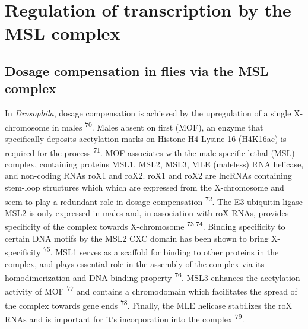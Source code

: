 \documentclass[11pt,twoside]{MPIthesis}
\theoremstyle{definition}
\theoremstyle{definition}
\theoremstyle{definition}
\theoremstyle{remark}
\begin{document}
\section{Regulation of transcription by the MSL
complex}\label{regulation-of-transcription-by-the-msl-complex}

\subsection{Dosage compensation in flies via the MSL
complex}\label{dosage-compensation-in-flies-via-the-msl-complex}

In \emph{Drosophila}, dosage compensation is achieved by the
upregulation of a single X-chromosome in males \textsuperscript{70}.
Males absent on first (MOF), an enzyme that specifically deposits
acetylation marks on Histone H4 Lysine 16 (H4K16ac) is required for the
process \textsuperscript{71}. MOF associates with the male-specific
lethal (MSL) complex, containing proteins MSL1, MSL2, MSL3, MLE
(maleless) RNA helicase, and non-coding RNAs roX1 and roX2. roX1 and
roX2 are lncRNAs containing stem-loop structures which which are
expressed from the X-chromosome and seem to play a redundant role in
dosage compensation \textsuperscript{72}. The E3 ubiquitin ligase MSL2
is only expressed in males and, in association with roX RNAs, provides
specificity of the complex towards X-chromosome \textsuperscript{73,74}.
Binding specificity to certain DNA motifs by the MSL2 CXC domain has
been shown to bring X-specificity \textsuperscript{75}. MSL1 serves as a
scaffold for binding to other proteins in the complex, and plays
essential role in the assembly of the complex via its homodimerization
and DNA binding property \textsuperscript{76}. MSL3 enhances the
acetylation activity of MOF \textsuperscript{77} and contains a
chromodomain which facilitates the spread of the complex towards gene
ends \textsuperscript{78}. Finally, the MLE helicase stabilizes the roX
RNAs and is important for it's incorporation into the complex
\textsuperscript{79}.
\end{document}
